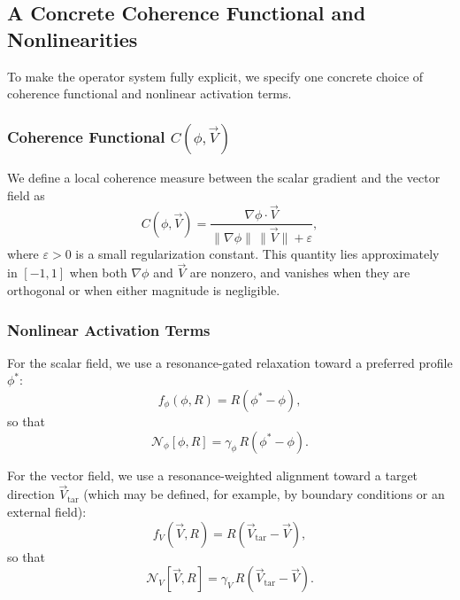 \subsection{A Concrete Coherence Functional and Nonlinearities}

To make the operator system fully explicit, we specify one concrete choice of
coherence functional and nonlinear activation terms.

\subsubsection*{Coherence Functional $C(\phi, \vec{V})$}

We define a local coherence measure between the scalar gradient and the vector field as
\begin{equation}
    C(\phi, \vec{V})
    = \frac{\nabla \phi \cdot \vec{V}}
           {\|\nabla \phi\|\,\|\vec{V}\| + \varepsilon},
    \label{eq:coherence-functional}
\end{equation}
where $\varepsilon > 0$ is a small regularization constant. This quantity lies approximately
in $[-1, 1]$ when both $\nabla \phi$ and $\vec{V}$ are nonzero, and vanishes when they are
orthogonal or when either magnitude is negligible.

\subsubsection*{Nonlinear Activation Terms}

For the scalar field, we use a resonance-gated relaxation toward a preferred profile $\phi^\ast$:
\begin{equation}
    f_\phi(\phi, R)
    = R \left( \phi^\ast - \phi \right),
\end{equation}
so that
\begin{equation}
    \mathcal{N}_\phi[\phi, R]
    = \gamma_\phi\, R \left( \phi^\ast - \phi \right).
\end{equation}

For the vector field, we use a resonance-weighted alignment toward a target direction
$\vec{V}_\mathrm{tar}$ (which may be defined, for example, by boundary conditions or an
external field):
\begin{equation}
    f_V(\vec{V}, R)
    = R \left( \vec{V}_\mathrm{tar} - \vec{V} \right),
\end{equation}
so that
\begin{equation}
    \mathcal{N}_V[\vec{V}, R]
    = \gamma_V\, R \left( \vec{V}_\mathrm{tar} - \vec{V} \right).
\end{equation}

